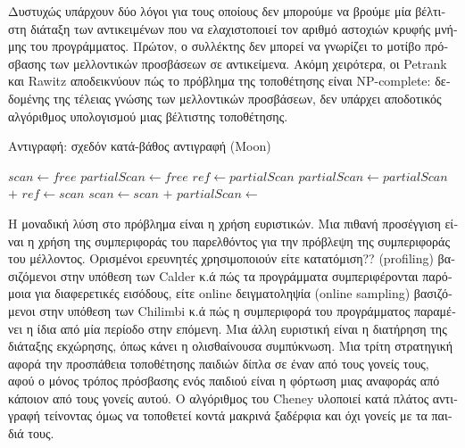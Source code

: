 \begin{greek}
Δυστυχώς υπάρχουν δύο λόγοι για τους οποίους δεν μπορούμε να
βρούμε μία βέλτιστη διάταξη των αντικειμένων που να ελαχιστοποιεί
τον αριθμό αστοχιών κρυφής μνήμης του προγράμματος. Πρώτον, ο
συλλέκτης δεν μπορεί να γνωρίζει το μοτίβο πρόσβασης των μελλοντικών
προσβάσεων σε αντικείμενα. Ακόμη χειρότερα, οι Petrank και Rawitz
\cite{DBLP:conf/popl/PetrankR02} αποδεικνύουν πώς το πρόβλημα της τοποθέτησης είναι NP-complete:
δεδομένης της τέλειας γνώσης των μελλοντικών προσβάσεων, δεν
υπάρχει αποδοτικός αλγόριθμος υπολογισμού μιας βέλτιστης τοποθέτησης.

\begin{algorithm}[H]
  \caption{Αντιγραφή: σχεδόν κατά-βάθος αντιγραφή (Moon)}
  \label{alg:c_4}
  \begin{algorithmic}[1]
      \State $scan \gets free$
      \State $partialScan \gets free$
    \EndProcedure
    \Statex
      \State {} 
    \EndProcedure
    \Statex
        \State $ref \gets partialScan$ 
        \State $partialScan \gets partialScan$ $+$ 
      \Else
        \State $ref \gets scan$ 
        \State $scan \gets scan$ $+$ 
      \EndIf
      \State {}
    \EndProcedure
    \Statex
     
      \State $partialScan \gets$ 
    \EndProcedure
  \end{algorithmic}
\end{algorithm}

Η μοναδική λύση στο πρόβλημα είναι η χρήση ευριστικών. Μια πιθανή
προσέγγιση είναι η χρήση της συμπεριφοράς του παρελθόντος για την
πρόβλεψη της συμπεριφοράς του μέλλοντος. Ορισμένοι ερευνητές 
χρησιμοποιούν είτε κατατόμιση?? (profiling) βασιζόμενοι στην υπόθεση
των Calder κ.ά \cite{DBLP:conf/asplos/CalderKJA98} πώς τα προγράμματα συμπεριφέρονται παρόμοια
για διαφερετικές εισόδους, είτε online δειγματοληψία (online sampling)
βασιζόμενοι στην υπόθεση των Chilimbi κ.ά \cite{DBLP:conf/pldi/ChilimbiHL99}
πώς η συμπεριφορά του προγράμματος παραμένει η ίδια από μία
περίοδο στην επόμενη. Μια άλλη ευριστική είναι η διατήρηση της
διάταξης εκχώρησης, όπως κάνει η ολισθαίνουσα συμπύκνωση. Μια
τρίτη στρατηγική αφορά την προσπάθεια τοποθέτησης παιδιών δίπλα
σε έναν από τους γονείς τους, αφού ο μόνος τρόπος πρόσβασης ενός
παιδιού είναι η φόρτωση μιας αναφοράς από κάποιον από τους γονείς
αυτού. Ο αλγόριθμος του Cheney υλοποιεί κατά πλάτος αντιγραφή
τείνοντας όμως να τοποθετεί κοντά μακρινά ξαδέρφια και όχι γονείς
με τα παιδιά τους.


\end{greek}
